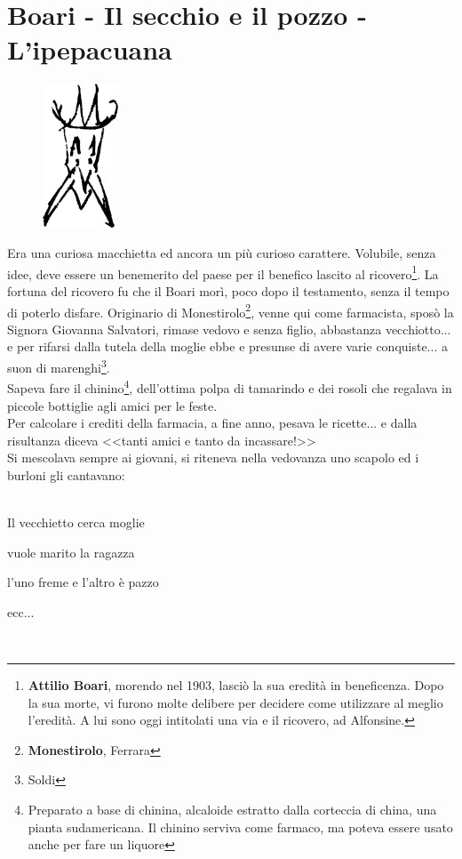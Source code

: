 
\chapter{Boari - Il secchio e il pozzo - L'ipepacuana}
\begin{figure}
  \vspace{-1.2cm}
  \begin{center}
    \includegraphics[width=0.2\textwidth]{Boari}
  \end{center}
  \vspace{-0.5cm}
\end{figure}
Era una curiosa macchietta ed ancora un più curioso carattere. Volubile, senza idee, deve essere un benemerito del paese per il benefico lascito al ricovero\footnote{\textbf{Attilio Boari}, morendo nel 1903, lasciò la sua eredità in beneficenza. Dopo la sua morte, vi furono molte delibere per decidere come utilizzare al meglio l'eredità. A lui sono oggi intitolati una via e il ricovero, ad Alfonsine.}. La fortuna del ricovero fu che il Boari morì, poco dopo il testamento, senza il tempo di poterlo disfare. Originario di Monestirolo\footnote{\textbf{Monestirolo}, Ferrara}, venne qui come farmacista, sposò la Signora Giovanna Salvatori, rimase vedovo e senza figlio, abbastanza vecchiotto... e per rifarsi dalla tutela della moglie ebbe e presunse di avere varie conquiste... a suon di marenghi\footnote{Soldi}.\\
\indent Sapeva fare il chinino\footnote{Preparato a base di chinina, alcaloide estratto dalla corteccia di china, una pianta sudamericana. Il chinino serviva come farmaco, ma poteva essere usato anche per fare un liquore}, dell'ottima polpa di tamarindo e dei rosoli che regalava in piccole bottiglie agli amici per le feste.\\
\indent Per calcolare i crediti della farmacia, a fine anno, pesava le ricette... e dalla risultanza diceva <<tanti amici e tanto da incassare!>>\\
\indent Si mescolava sempre ai giovani, si riteneva nella vedovanza uno scapolo ed i burloni gli cantavano:\\\\
\textcal \Huge
	\centerline{Il vecchietto cerca moglie}
	\centerline{vuole marito la ragazza}
	\centerline{l'uno freme e l'altro è pazzo}
	\centerline{ecc...}
\normalfont \normalsize\\

